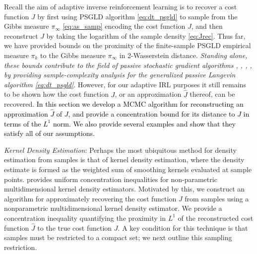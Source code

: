 \documentclass[journal,onecolumn]{IEEEtran}
\newcommand{\rew}{J}
\newcommand{\gibbs}{\ids_{\infty}}
\newcommand{\dtlaw}{\ids_{k}} %
\newcommand{\ids}{\pi}
\newcommand{\idw}{\gamma}
\newcommand{\ksp}{k,\idw}
\begin{document}
Recall the aim of adaptive inverse reinforcement learning is to recover a cost function $\rew$ by first using PSGLD algorithm \eqref{eq:dt_psgld} to sample from the Gibbs measure $\gibbs$ \eqref{eq:as_samp} encoding the cost function $\rew$, and then reconstruct $\rew$ by taking the logarithm of the sample density \eqref{eq:Jrec}. Thus far, we have provided bounds on the proximity of the finite-sample PSGLD empirical measure $\dtlaw$ to the Gibbs measure $\gibbs$ in 2-Wasserstein distance. \textit{Standing alone, these bounds contribute to the field of passive stochastic gradient algorithms \cite{YY96}, \cite{nazin1989passive}, \cite{revesz1977apply}, \cite{hardle1987nonparametric}, by providing sample-complexity analysis for the generalized passive Langevin algorithm \eqref{eq:dt_psgld}}. However, for our adaptive IRL purposes it still remains to be shown how the cost function $\rew$, or an approximation $\hat{\rew}$ thereof, can be recovered. \textcolor{black}{In this section we develop a MCMC algorithm for reconstructing an approximation $\hat{\rew}$ of $\rew$, and provide a concentration bound for its distance to $\rew$ in terms of the $L^1$ norm. We also provide several examples and show that they satisfy all of our assumptions.}
\vspace{0.1cm}



\textit{Kernel Density Estimation}: Perhaps the most ubiquitous method for density estimation  from samples \cite{silverman2018density} is that of kernel density estimation, where the density estimate is formed as the weighted sum of smoothing kernels evaluated at sample points. \cite{vogel2013uniform} provides uniform concentration inequalities for non-parametric multidimensional kernel density estimators. Motivated by this, we construct an algorithm for approximately recovering the cost function $\rew$ from samples using a nonparametric multidimensional kernel density estimator. We provide a concentration inequality quantifying the proximity in $L^1$ of the reconstructed cost function $\hat{\rew}$ to the true cost function $\rew$. A key condition for this technique is that samples must be restricted to a compact set; we next outline this sampling restriction.
\end{document}
